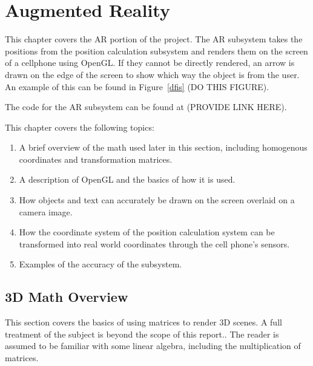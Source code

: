 
\chapter{Augmented Reality} %

\label{AugmentedReality}


This chapter covers the AR portion of the project. The AR subsystem takes the positions from the position calculation subsystem and renders them on the screen of a cellphone using OpenGL. If they cannot be directly rendered, an arrow is drawn on the edge of the screen to show which way the object is from the user. An example of this can be found in Figure~\ref{dfis} (DO THIS FIGURE).

The code for the AR subsystem can be found at (PROVIDE LINK HERE).

This chapter covers the following topics:
\begin{enumerate}
	\item A brief overview of the math used later in this section, including homogenous coordinates and transformation matrices.
	\item A description of OpenGL and the basics of how it is used. 
	\item How objects and text can accurately be drawn on the screen overlaid on a camera image.
	\item How the coordinate system of the position calculation system can be transformed into real world coordinates through the cell phone's sensors.
	\item Examples of the accuracy of the subsystem.
\end{enumerate}

\section{3D Math Overview}
This section covers the basics of using matrices to render 3D scenes. A full treatment of the subject is beyond the scope of this report.. The reader is assumed to be familiar with some linear algebra, including the multiplication of matrices. 

